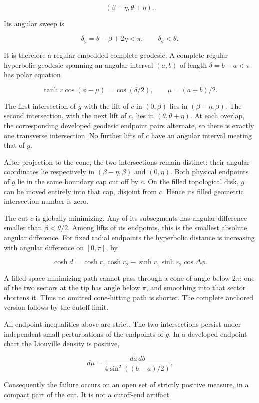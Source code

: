 \documentclass[11pt]{article}
\begin{document}
\[
(\beta-\eta,\theta+\eta).
\]

Its angular sweep is

\[
\delta_g=\theta-\beta+2\eta<\pi,
\qquad \delta_g<\theta.
\]

It is therefore a regular embedded complete geodesic. A complete regular
hyperbolic geodesic spanning an angular interval \((a,b)\) of length
\(\delta=b-a<\pi\) has polar equation

\[
\tanh r\cos(\phi-\mu)=\cos(\delta/2),
\qquad \mu=(a+b)/2.
\tag{1}
\]

The first intersection of \(g\) with the lift of \(c\) in \((0,\beta)\)
lies in \((\beta-\eta,\beta)\). The second intersection, with the next
lift of \(c\), lies in \((\theta,\theta+\eta)\). At each overlap, the
corresponding developed geodesic endpoint pairs alternate, so there is
exactly one transverse intersection. No further lifts of \(c\) have an
angular interval meeting that of \(g\).

After projection to the cone, the two intersections remain distinct:
their angular coordinates lie respectively in \((\beta-\eta,\beta)\) and
\((0,\eta)\). Both physical endpoints of \(g\) lie in the same boundary
cap cut off by \(c\). On the filled topological disk, \(g\) can be moved
entirely into that cap, disjoint from \(c\). Hence its filled geometric
intersection number is zero.

The cut \(c\) is globally minimizing. Any of its subsegments has angular
difference smaller than \(\beta<\theta/2\). Among lifts of its
endpoints, this is the smallest absolute angular difference. For fixed
radial endpoints the hyperbolic distance is increasing with angular
difference on \([0,\pi]\), by

\[
\cosh d=\cosh r_1\cosh r_2-\sinh r_1\sinh r_2\cos\Delta\phi.
\]

A filled-space minimizing path cannot pass through a cone of angle below
\(2\pi\): one of the two sectors at the tip has angle below \(\pi\), and
smoothing into that sector shortens it. Thus no omitted cone-hitting
path is shorter. The complete anchored version follows by the cutoff
limit.

All endpoint inequalities above are strict. The two intersections
persist under independent small perturbations of the endpoints of \(g\).
In a developed endpoint chart the Liouville density is positive,

\[
d\mu=\frac{da\,db}{4\sin^2((b-a)/2)}.
\]

Consequently the failure occurs on an open set of strictly positive
measure, in a compact part of the cut. It is not a cutoff-end artifact.
\end{document}
